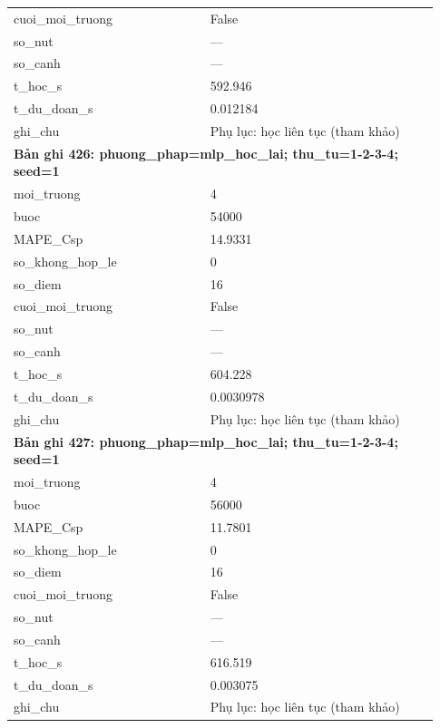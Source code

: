 \begin{longtable}{p{0.43\linewidth}p{0.50\linewidth}}
cuoi\_\allowbreak moi\_\allowbreak truong & False \\
so\_\allowbreak nut & — \\
so\_\allowbreak canh & — \\
t\_\allowbreak hoc\_\allowbreak s & 592.946 \\
t\_\allowbreak du\_\allowbreak doan\_\allowbreak s & 0.012184 \\
ghi\_\allowbreak chu & Phụ lục: học liên tục (tham khảo) \\
\midrule
\multicolumn{2}{p{0.95\linewidth}}{\textbf{Bản ghi 426: phuong\_phap=mlp\_hoc\_lai; thu\_tu=1-2-3-4; seed=1}} \\
moi\_\allowbreak truong & 4 \\
buoc & 54000 \\
MAPE\_\allowbreak Csp & 14.9331 \\
so\_\allowbreak khong\_\allowbreak hop\_\allowbreak le & 0 \\
so\_\allowbreak diem & 16 \\
cuoi\_\allowbreak moi\_\allowbreak truong & False \\
so\_\allowbreak nut & — \\
so\_\allowbreak canh & — \\
t\_\allowbreak hoc\_\allowbreak s & 604.228 \\
t\_\allowbreak du\_\allowbreak doan\_\allowbreak s & 0.0030978 \\
ghi\_\allowbreak chu & Phụ lục: học liên tục (tham khảo) \\
\midrule
\multicolumn{2}{p{0.95\linewidth}}{\textbf{Bản ghi 427: phuong\_phap=mlp\_hoc\_lai; thu\_tu=1-2-3-4; seed=1}} \\
moi\_\allowbreak truong & 4 \\
buoc & 56000 \\
MAPE\_\allowbreak Csp & 11.7801 \\
so\_\allowbreak khong\_\allowbreak hop\_\allowbreak le & 0 \\
so\_\allowbreak diem & 16 \\
cuoi\_\allowbreak moi\_\allowbreak truong & False \\
so\_\allowbreak nut & — \\
so\_\allowbreak canh & — \\
t\_\allowbreak hoc\_\allowbreak s & 616.519 \\
t\_\allowbreak du\_\allowbreak doan\_\allowbreak s & 0.003075 \\
ghi\_\allowbreak chu & Phụ lục: học liên tục (tham khảo) \\

\end{longtable}
